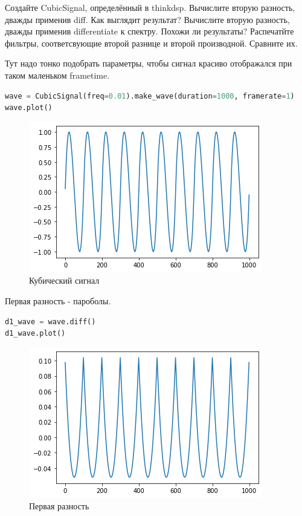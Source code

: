 Создайте CubicSignal, определённый в thinkdsp. Вычислите вторую разность, дважды применив diff. Как выглядит результат? Вычислите вторую разность, дважды применив differentiate к спектру. Похожи ли результаты? Распечатйте фильтры, соответсвующие второй разнице и второй производной. Сравните их.

Тут надо тонко подобрать параметры, чтобы сигнал красиво отображался при таком маленьком frametime.

\begin{lstlisting}[language=Python]
wave = CubicSignal(freq=0.01).make_wave(duration=1000, framerate=1)
wave.plot()
\end{lstlisting}
\begin{figure}[H]
	\begin{center}
		\includegraphics[scale=1]{fig/lab09/lab09_28_0.png}
		\caption{Кубический сигнал}
	\end{center}
\end{figure}

Первая разность - пароболы.

\begin{lstlisting}[language=Python]
d1_wave = wave.diff()
d1_wave.plot()
\end{lstlisting}
\begin{figure}[H]
	\begin{center}
		\includegraphics[scale=1]{fig/lab09/lab09_30_0.png}
		\caption{Первая разность}
	\end{center}
\end{figure}

